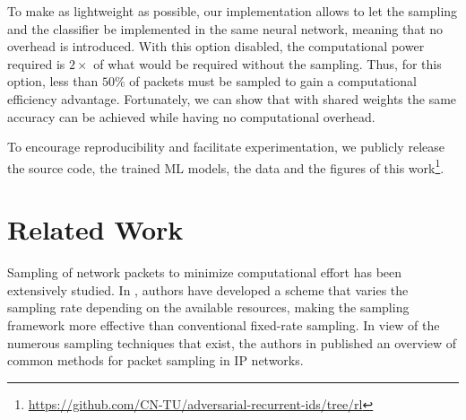 \documentclass[conference]{IEEEtran}
\begin{document}
To make \ours{} as lightweight as possible, our implementation allows to let the sampling and the classifier be implemented in the same neural network, meaning that no overhead is introduced. With this option disabled, the computational power required is $2\times$ of what would be required without the sampling. Thus, for this option, less than $50\%$ of packets must be sampled to gain a computational efficiency advantage. Fortunately, we can show that with shared weights the same accuracy can be achieved while having no computational overhead.  

To encourage reproducibility and facilitate experimentation, we publicly release the source code, the trained ML models, the data and the figures of this work\footnote{\url{https://github.com/CN-TU/adversarial-recurrent-ids/tree/rl}}.

\section{Related Work}


Sampling of network packets to minimize computational effort has been extensively studied. %
In \cite{estan_building_2004}, authors have developed a scheme that varies the sampling rate depending on the available resources, making the sampling framework more effective than conventional fixed-rate sampling. In view of the numerous sampling techniques that exist, the authors in \cite{zseby_sampling_2005} published an overview of common methods for packet sampling in IP networks.

\end{document}
